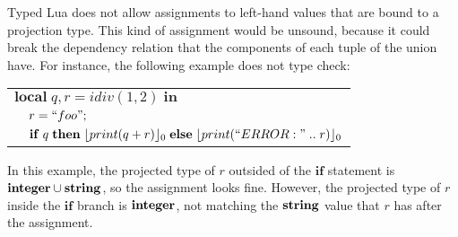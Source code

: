 Typed Lua does not allow assignments to left-hand values that are bound
to a projection type.
This kind of assignment would be unsound, because it could break the
dependency relation that the components of each tuple of the union have.
For instance, the following example does not type check:
\begin{center}
\begin{tabular}{ll}
\multicolumn{2}{l}{$\mathbf{local} \; q, r = idiv(1, 2) \; \mathbf{in}$}\\
& \multicolumn{1}{l}{$r = ``foo";$}\\
& \multicolumn{1}{l}{$\mathbf{if} \; q \; \mathbf{then} \; \lfloor print(q + r) \rfloor_{0} \; \mathbf{else} \; \lfloor print(``ERROR: " \; .. \; r) \rfloor_{0}$}
\end{tabular}
\end{center}

In this example, the projected type of $r$ outsided of the $\mathbf{if}$
statement is $\mathbf{integer} \cup \mathbf{string}$, so the assignment looks fine.
However, the projected type of $r$ inside the $\mathbf{if}$ branch is $\mathbf{integer}$,
not matching the $\mathbf{string}$ value that $r$ has after the assignment.
